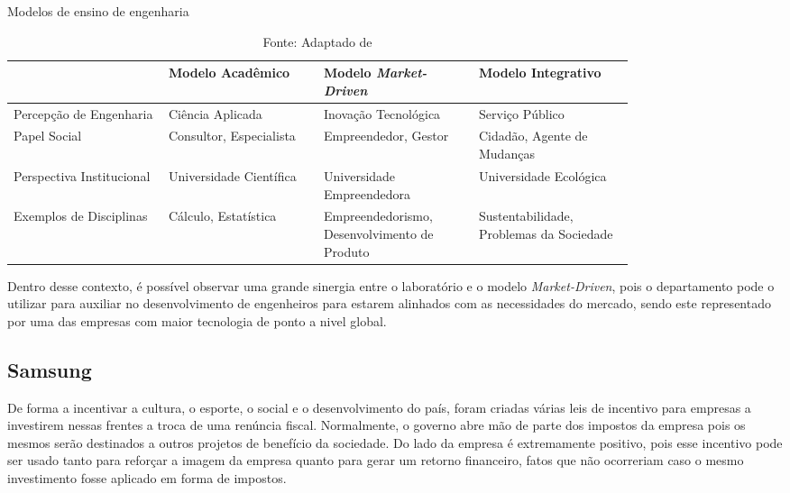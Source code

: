 \begin{table}[h]
\begin{center}
\caption{Modelos de ensino de engenharia}
\label{tab:modelos_ensino_tab}
{\def\arraystretch{2}\tabcolsep=10pt
\begin{tabular}{>{\raggedright}p{0.2\linewidth}>{\raggedright\arraybackslash}p{0.2\linewidth}>{\raggedright\arraybackslash}p{0.2\linewidth}>{\raggedright\arraybackslash}p{0.2\linewidth}}
\hline
     & Modelo Acadêmico & Modelo \textit{Market-Driven} & Modelo Integrativo \\ \hline
     Percepção de Engenharia & Ciência Aplicada & Inovação Tecnológica & Serviço Público \\
     Papel Social & Consultor, Especialista & Empreendedor, Gestor & Cidadão, Agente de Mudanças \\
     Perspectiva Institucional & Universidade Científica & Universidade Empreendedora & Universidade Ecológica  \\
	 Exemplos de Disciplinas & Cálculo, Estatística & Empreendedorismo, Desenvolvimento de Produto & Sustentabilidade, Problemas da Sociedade \\ \hline
\end{tabular}%
}
\caption* {Fonte: Adaptado de }
\end{center}
\end{table}

Dentro desse contexto, é possível observar uma grande sinergia entre o laboratório e o modelo \textit{Market-Driven}, pois o departamento pode o utilizar para auxiliar no desenvolvimento de engenheiros para estarem alinhados com as necessidades do mercado, sendo este representado por uma das empresas com maior tecnologia de ponto a nivel global.

\subsection{Samsung}
\label{sec:con_samsung}

De forma a incentivar a cultura, o esporte, o social e o desenvolvimento do país, foram criadas várias leis de incentivo para empresas a investirem nessas frentes a troca de uma renúncia fiscal.  Normalmente, o governo abre mão de parte dos impostos da empresa pois os mesmos serão destinados a outros projetos de benefício da sociedade. Do lado da empresa é extremamente positivo, pois esse incentivo pode ser usado tanto para reforçar a imagem da empresa quanto para gerar um retorno financeiro, fatos que não ocorreriam caso o mesmo investimento fosse aplicado em forma de impostos.

